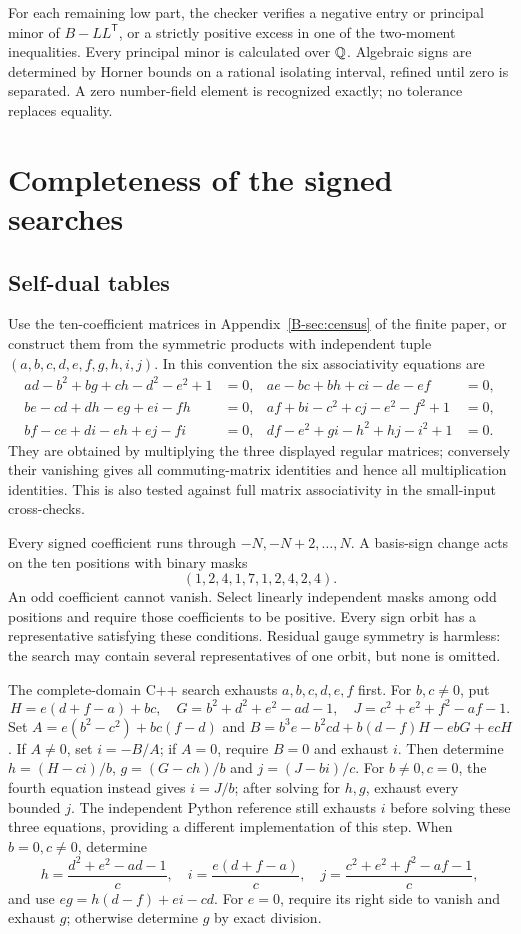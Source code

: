 \documentclass[11pt]{article}
\begin{document}
For each remaining low part, the checker verifies a negative entry or
principal minor of $B-LL^{\mathsf T}$, or a strictly positive excess in
one of the two-moment inequalities. Every principal minor is calculated
over $\mathbb Q$. Algebraic signs are determined by Horner bounds on a rational
isolating interval, refined until zero is separated. A zero number-field
element is recognized exactly; no tolerance replaces equality.

\section{Completeness of the signed searches}
\subsection{Self-dual tables}
Use the ten-coefficient matrices in Appendix~\ref{B-sec:census} of the
finite paper, or
construct them from the symmetric products with independent tuple
$(a,b,c,d,e,f,g,h,i,j)$. In this convention the six associativity equations
are
\begin{align*}
 ad-b^2+bg+ch-d^2-e^2+1&=0,&ae-bc+bh+ci-de-ef&=0,\\
 be-cd+dh-eg+ei-fh&=0,&af+bi-c^2+cj-e^2-f^2+1&=0,\\
 bf-ce+di-eh+ej-fi&=0,&df-e^2+gi-h^2+hj-i^2+1&=0.
\end{align*}
They are obtained by multiplying the three displayed regular matrices;
conversely their vanishing gives all commuting-matrix identities and hence
all multiplication identities. This is also tested against full matrix
associativity in the small-input cross-checks.

Every signed coefficient runs through $-N,-N+2,\ldots,N$. A basis-sign
change acts on the ten positions with binary masks
\[
 (1,2,4,1,7,1,2,4,2,4).
\]
An odd coefficient cannot vanish. Select linearly independent masks among
odd positions and require those coefficients to be positive. Every sign
orbit has a representative satisfying these conditions. Residual gauge
symmetry is harmless: the search may contain several representatives of
one orbit, but none is omitted.

The complete-domain C++ search exhausts $a,b,c,d,e,f$ first.
For $b,c\ne0$, put
\[
 H=e(d+f-a)+bc,\quad G=b^2+d^2+e^2-ad-1,
 \quad J=c^2+e^2+f^2-af-1.
\]
Set $A=e(b^2-c^2)+bc(f-d)$ and
$B=b^3e-b^2cd+b(d-f)H-ebG+ecH$.
If $A\ne0$, set $i=-B/A$; if $A=0$, require $B=0$ and exhaust $i$.
Then determine $h=(H-ci)/b$, $g=(G-ch)/b$ and $j=(J-bi)/c$.
For $b\ne0,c=0$, the fourth equation instead gives $i=J/b$;
after solving for $h,g$, exhaust every bounded $j$.
The independent Python reference still exhausts $i$ before solving
these three equations, providing a different implementation of this step.
When $b=0,c\ne0$, determine
\[
 h=\frac{d^2+e^2-ad-1}{c},\quad
 i=\frac{e(d+f-a)}c,\quad
 j=\frac{c^2+e^2+f^2-af-1}c,
\]
and use $eg=h(d-f)+ei-cd$. For $e=0$, require its right side to vanish
and exhaust $g$; otherwise determine $g$ by exact division.
\end{document}
